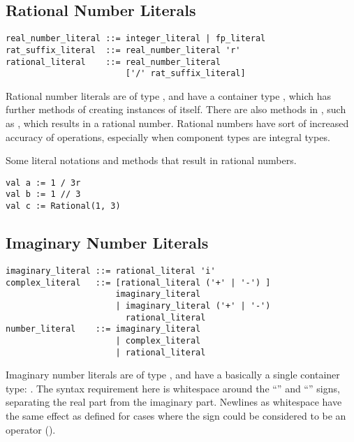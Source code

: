 \subsection{Rational Number Literals}
\label{sec:rationalliterals}

\syntax\begin{lstlisting}
real_number_literal ::= integer_literal | fp_literal
rat_suffix_literal  ::= real_number_literal 'r'
rational_literal    ::= real_number_literal 
                        ['/' rat_suffix_literal]
\end{lstlisting}

Rational number literals are of type , and have a container type , which has further methods of creating instances of itself. There are also methods in , such as \code{//}, which results in a rational number. Rational numbers have sort of increased accuracy of operations, especially when component types are integral types. 

\example Some literal notations and methods that result in rational numbers. 
\begin{lstlisting}
val a := 1 / 3r
val b := 1 // 3
val c := Rational(1, 3)
\end{lstlisting}





\subsection{Imaginary Number Literals}
\label{sec:imaginaryliterals}

\syntax\begin{lstlisting}
imaginary_literal ::= rational_literal 'i'
complex_literal   ::= [rational_literal ('+' | '-') ]
                      imaginary_literal
	                  | imaginary_literal ('+' | '-') 
	                    rational_literal
number_literal    ::= imaginary_literal
	                  | complex_literal
	                  | rational_literal
\end{lstlisting}

Imaginary number literals are of type , and have a basically a single container type: . The syntax requirement here is whitespace around the ``\code{+}'' and ``\code{+}'' signs, separating the real part from the imaginary part. Newlines as whitespace have the same effect as defined for cases where the sign could be considered to be an operator ().





